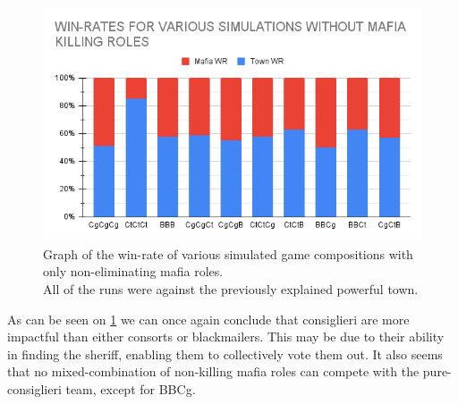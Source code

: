 \begin{figure}[H]
    \includegraphics[width=1\linewidth]{figures/Winrates_NonKilling}
    \caption{Graph of the win-rate of various
        simulated game compositions with only
        non-eliminating mafia roles.\\
        All of the runs were against the previously explained powerful town.}
    \label{fig:VariousSimulationsNonKilling}
\end{figure}
\vspace{-5px} As can be seen on \cref{fig:VariousSimulationsNonKilling} we can once again conclude that
consiglieri are more impactful than either consorts or blackmailers. This may
be due to their ability in finding the sheriff, enabling them to
collectively vote them out. It also seems that no mixed-combination of
non-killing mafia roles can compete with the pure-consiglieri team, except for BBCg.
